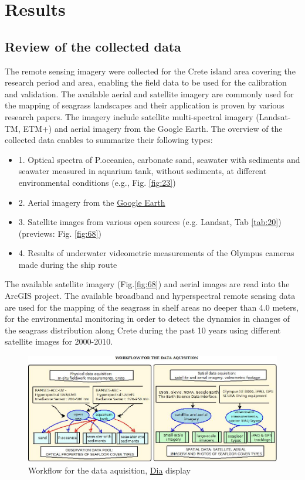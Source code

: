 \documentclass[10pt, a4paper]{article}
\begin{document}
\pagebreak
\section{Results}

\subsection{Review of the collected data}
The remote sensing imagery were collected for the Crete island area covering the research period and
area, enabling the field data to be used for the calibration and validation. The available aerial and
satellite imagery are commonly used for the mapping of seagrass landscapes and their application is
proven by various research papers. The imagery include satellite multi-spectral imagery (Landsat-TM,
ETM+) and aerial imagery from the Google Earth.
The overview of the collected data enables to summarize their following types:
\begin{itemize}
	\item[] 1. Optical spectra of P.oceanica, carbonate sand, seawater with sediments and seawater measured in aquarium tank, without sediments, at different environmental conditions (e.g., Fig. \ref{fig:23})
	\item[]2. Aerial imagery from the \href{http://www.google.com/earth/index.html}{Google Earth}
	\item[]3. Satellite images from various open sources (e.g. Landsat, Tab \ref{tab:20}) (previews: Fig. \ref{fig:68})
	\item[]4. Results of underwater videometric measurements of the Olympus cameras made during the ship route
\end{itemize}
The available satellite imagery (Fig.\ref{fig:68}) and aerial images are read into the ArcGIS project.
The available broadband and hyperspectral remote sensing data are used for the mapping of the
seagrass in shelf areas no deeper than 4.0 meters, for the environmental monitoring in order to detect
the dynamics in changes of the seagrass distribution along Crete during the past 10 years using
different satellite images for 2000-2010.

\begin{figure}[h]
	\centering
	\includegraphics[scale=0.40]{UML_Dia.jpg}
	\caption{Workflow for the data aquisition, \href{http://live.gnome.org/Dia}{Dia} display}
	\label{fig:21}
\end{figure}
\end{document}
